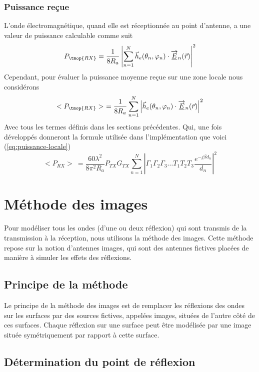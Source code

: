 \subsubsection*{Puissance reçue}
L'onde {\'e}lectromagn{\'e}tique, quand elle est r{\'e}ceptionn{\'e}e au point
d'antenne, a une valeur de puissance calculable
comme suit
\[ P_{\tmop{RX}} = \frac{1}{8 R_a} \left| \sum_{n = 1}^N \vec{h}_e (\theta_n,
   \varphi_n) \cdot \overrightarrow{\underline{E}}_n (\vec{r}) \right|^2 \]
Cependant, pour {\'e}valuer la puissance moyenne re{\c c}ue sur une zone locale nous considérons 
\[ < P_{\tmop{RX}} >\ = \frac{1}{8 R_a} \sum_{n = 1}^N \left| \vec{h}_e (\theta_n,
   \varphi_n) \cdot \overrightarrow{\underline{E}}_n (\vec{r}) \right|^2 \]
Avec tous les termes d{\'e}finis dans les sections pr{\'e}c{\'e}dentes. Qui, une fois développés donneront la formule utilisée dans l'implémentation que voici
(\ref{eq:puissance-locale})
\begin{equation}
\label{eq:puissance-locale}
    <P_{RX}>\ = \frac{60 \lambda^2}{8 \pi^2 R_a}P_{TX}G_{TX}\sum_{n=1}^N \left| \Gamma_1 \Gamma_2 \Gamma_3 \dotsc T_1 T_2 T_3 \frac{e^{-j \beta d_n}}{d_n} \right|^2
\end{equation}
\section{M{\'e}thode des images}

Pour mod{\'e}liser tous les ondes (d'une ou deux r{\'e}flexion) qui sont
transmis de la transmission {\`a} la r{\'e}ception, nous utilisons la
m{\'e}thode des images. Cette m{\'e}thode repose sur la notion d'antennes
images, qui sont des antennes fictives plac{\'e}es de mani{\`e}re {\`a}
simuler les effets des r{\'e}flexions.

\subsection{Principe de la m{\'e}thode}

Le principe de la m{\'e}thode des images est de remplacer les r{\'e}flexions
des ondes sur les surfaces par des sources fictives, appel{\'e}es images,
situ{\'e}es de l'autre c{\^o}t{\'e} de ces surfaces. Chaque r{\'e}flexion sur
une surface peut {\^e}tre mod{\'e}lis{\'e}e par une image situ{\'e}e
sym{\'e}triquement par rapport {\`a} cette surface.

\subsection{D{\'e}termination du point de r{\'e}flexion}

